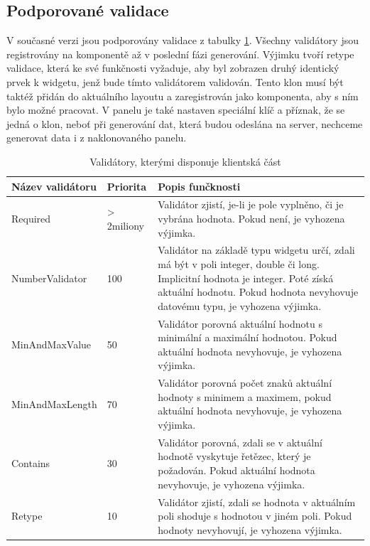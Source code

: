 \subsection{Podporované validace}
V současné verzi jsou podporovány validace z tabulky \ref{table:validations}. Všechny validátory jsou registrovány na komponentě až v poslední fázi generování. Výjimku tvoří retype validace, která ke své funkčnosti vyžaduje, aby byl zobrazen druhý identický prvek k widgetu, jenž bude tímto validátorem validován. Tento klon musí být taktéž přidán do aktuálního layoutu a zaregistrován jako komponenta, aby s ním bylo možné pracovat. V panelu je také nastaven speciální klíč a příznak, že se jedná o klon, neboť při generování dat, která budou odeslána na server, nechceme generovat data i z naklonovaného panelu.
\begin{table}[width=\linewidth]
\begin{center}
\caption{Validátory, kterými disponuje klientská část}
\label{table:validations}
\begin{tabular}{|p{4cm}|p{2cm}|p{8cm}|}
\hline
\textbf{Název validátoru} & \textbf{Priorita} & \textbf{Popis funčknosti} \\
\hline
Required & > 2miliony & 
Validátor zjistí, je-li je pole vyplněno, či je vybrána hodnota. Pokud není, je vyhozena výjimka. \\
\hline
NumberValidator & 100 &
Validátor na základě typu widgetu určí, zdali má být v poli integer, double či long. Implicitní hodnota je integer. Poté získá aktuální hodnotu. Pokud hodnota nevyhovuje datovému typu, je vyhozena výjimka. \\
\hline
MinAndMaxValue & 50 &
Validátor porovná aktuální hodnotu s minimální a maximální hodnotou. Pokud aktuální hodnota nevyhovuje, je vyhozena výjimka. \\
\hline
MinAndMaxLength & 70 &
Validátor porovná počet znaků aktuální hodnoty s minimem a maximem, pokud aktuální hodnota nevyhovuje, je vyhozena výjimka. \\
\hline
Contains & 30 &
Validátor porovná, zdali se v aktuální hodnotě vyskytuje řetězec, který je požadován. Pokud aktuální hodnota nevyhovuje, je vyhozena výjimka. \\
\hline
Retype & 10 &
Validátor zjistí, zdali se hodnota v aktuálním poli shoduje s hodnotou v jiném poli. Pokud hodnoty nevyhovují, je vyhozena výjimka. \\
\hline
\end{tabular}
\end{center}
\end{table}

